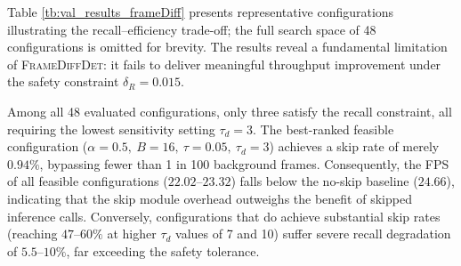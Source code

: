 \documentclass[
  10pt,
]{article}
\begin{document}
\begin{table}[hbtp]
    \caption{Representative \textsc{FrameDiffDet} hyperparameter configurations
        evaluated on the validation set, illustrating the recall--efficiency
        trade-off across the full search space of 48 configurations (subset
        shown for brevity). Configurations with a ranking score of ``-'' violate
        the recall constraint ($\delta_R = 0.015$) and are included solely to
        illustrate the trade-off at higher skip rates. Recall (\%) reports the
        retained recall with the absolute drop relative to the baseline in
        parentheses, i.e., $R\ (-\Delta R)$. The best and second-best values per
        metric are highlighted in \textbf{bold} and \underline{\textit{italic
        underline}}, respectively.}
    \label{tb:val_results_frameDiff}
\end{table}


Table \ref{tb:val_results_frameDiff} presents representative
configurations illustrating the recall--efficiency trade-off; the full
search space of 48 configurations is omitted for brevity. The results
reveal a fundamental limitation of \textsc{FrameDiffDet}: it fails to
deliver meaningful throughput improvement under the safety constraint
\(\delta_R = 0.015\).

Among all 48 evaluated configurations, only three satisfy the recall
constraint, all requiring the lowest sensitivity setting \(\tau_d = 3\).
The best-ranked feasible configuration
(\(\alpha{=}0.5,\ B{=}16,\ \tau{=}0.05,\ \tau_d{=}3\)) achieves a skip
rate of merely \(0.94\%\), bypassing fewer than 1 in 100 background
frames. Consequently, the FPS of all feasible configurations
(\(22.02\)--\(23.32\)) falls below the no-skip baseline (\(24.66\)),
indicating that the skip module overhead outweighs the benefit of
skipped inference calls. Conversely, configurations that do achieve
substantial skip rates (reaching \(47\)--\(60\%\) at higher \(\tau_d\)
values of 7 and 10) suffer severe recall degradation of
\(5.5\)--\(10\%\), far exceeding the safety tolerance.
\end{document}

